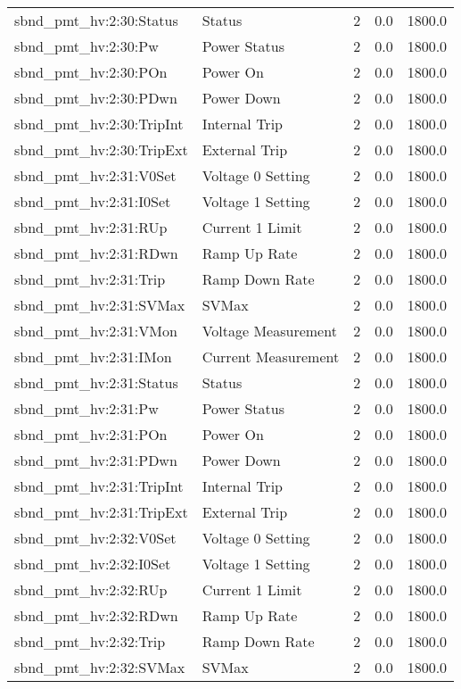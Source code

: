 \begin{center}
\begin{longtable}{l | l l l l }
sbnd\_pmt\_hv:2:30:Status & Status & 2 & 0.0 & 1800.0\\ 
sbnd\_pmt\_hv:2:30:Pw & Power Status & 2 & 0.0 & 1800.0\\ 
sbnd\_pmt\_hv:2:30:POn & Power On & 2 & 0.0 & 1800.0\\ 
sbnd\_pmt\_hv:2:30:PDwn & Power Down & 2 & 0.0 & 1800.0\\ 
sbnd\_pmt\_hv:2:30:TripInt & Internal Trip & 2 & 0.0 & 1800.0\\ 
sbnd\_pmt\_hv:2:30:TripExt & External Trip & 2 & 0.0 & 1800.0\\ 
sbnd\_pmt\_hv:2:31:V0Set & Voltage 0 Setting & 2 & 0.0 & 1800.0\\ 
sbnd\_pmt\_hv:2:31:I0Set & Voltage 1 Setting & 2 & 0.0 & 1800.0\\ 
sbnd\_pmt\_hv:2:31:RUp & Current 1 Limit & 2 & 0.0 & 1800.0\\ 
sbnd\_pmt\_hv:2:31:RDwn & Ramp Up Rate & 2 & 0.0 & 1800.0\\ 
sbnd\_pmt\_hv:2:31:Trip & Ramp Down Rate & 2 & 0.0 & 1800.0\\ 
sbnd\_pmt\_hv:2:31:SVMax & SVMax & 2 & 0.0 & 1800.0\\ 
sbnd\_pmt\_hv:2:31:VMon & Voltage Measurement & 2 & 0.0 & 1800.0\\ 
sbnd\_pmt\_hv:2:31:IMon & Current Measurement & 2 & 0.0 & 1800.0\\ 
sbnd\_pmt\_hv:2:31:Status & Status & 2 & 0.0 & 1800.0\\ 
sbnd\_pmt\_hv:2:31:Pw & Power Status & 2 & 0.0 & 1800.0\\ 
sbnd\_pmt\_hv:2:31:POn & Power On & 2 & 0.0 & 1800.0\\ 
sbnd\_pmt\_hv:2:31:PDwn & Power Down & 2 & 0.0 & 1800.0\\ 
sbnd\_pmt\_hv:2:31:TripInt & Internal Trip & 2 & 0.0 & 1800.0\\ 
sbnd\_pmt\_hv:2:31:TripExt & External Trip & 2 & 0.0 & 1800.0\\ 
sbnd\_pmt\_hv:2:32:V0Set & Voltage 0 Setting & 2 & 0.0 & 1800.0\\ 
sbnd\_pmt\_hv:2:32:I0Set & Voltage 1 Setting & 2 & 0.0 & 1800.0\\ 
sbnd\_pmt\_hv:2:32:RUp & Current 1 Limit & 2 & 0.0 & 1800.0\\ 
sbnd\_pmt\_hv:2:32:RDwn & Ramp Up Rate & 2 & 0.0 & 1800.0\\ 
sbnd\_pmt\_hv:2:32:Trip & Ramp Down Rate & 2 & 0.0 & 1800.0\\ 
sbnd\_pmt\_hv:2:32:SVMax & SVMax & 2 & 0.0 & 1800.0\\ 

\end{longtable}
\end{center}
